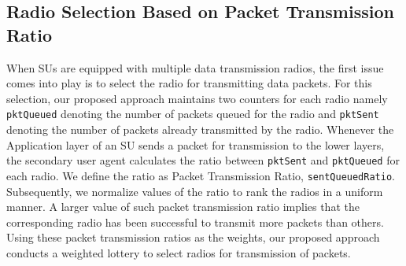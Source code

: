 \documentclass[letterpaper,conference]{IEEEtran}
\begin{document}

\subsection{Radio Selection Based on Packet Transmission Ratio}
\label{subsec:radioSelect}

When SUs are equipped with multiple data transmission radios, the first issue comes into play is to select the radio for transmitting data packets. For this selection, our proposed approach maintains two counters for each radio namely \texttt{pktQueued} denoting the number of packets queued for the radio and \texttt{pktSent} denoting the number of packets already transmitted by the radio. Whenever the Application layer of an SU sends a packet for transmission to the lower layers, the secondary user agent calculates the ratio between 	\texttt{pktSent} and \texttt{pktQueued} for each radio. We define the ratio as Packet Transmission Ratio, \texttt{sentQueuedRatio}. Subsequently, we normalize values of the ratio to rank the radios in a uniform manner. A larger value of such packet transmission ratio implies that the corresponding radio has been successful to transmit more packets than others. Using these packet transmission ratios as the weights, our proposed approach conducts a weighted lottery to select radios for transmission of packets.
\end{document}
